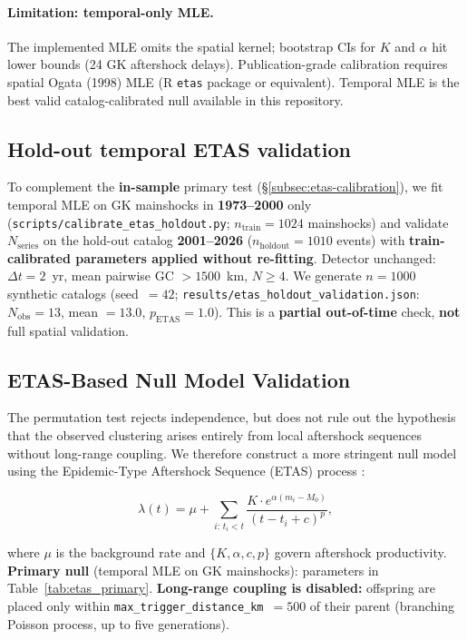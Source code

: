 \documentclass[draft]{agujournal2019}
\begin{document}
\paragraph{Limitation: temporal-only MLE.}
The implemented MLE omits the spatial kernel; bootstrap CIs for $K$ and
$\alpha$ hit lower bounds (24 GK aftershock delays). Publication-grade
calibration requires spatial Ogata (1998) MLE (R \texttt{etas} package or
equivalent). Temporal MLE is the best valid catalog-calibrated null
available in this repository.

\subsection{Hold-out temporal ETAS validation}
\label{subsec:holdout-methods}

To complement the \textbf{in-sample} primary test (\S\ref{subsec:etas-calibration}),
we fit temporal MLE on GK mainshocks in \textbf{1973--2000} only
(\texttt{scripts/calibrate\_etas\_holdout.py}; $n_\mathrm{train}=1024$ mainshocks)
and validate $N_\mathrm{series}$ on the hold-out catalog \textbf{2001--2026}
($n_\mathrm{holdout}=1010$ events) with \textbf{train-calibrated parameters
applied without re-fitting}.
Detector unchanged: $\Delta t = 2$~yr, mean pairwise GC $> 1500$~km, $N \ge 4$.
We generate $n = 1000$ synthetic catalogs (seed~$= 42$;
\texttt{results/etas\_holdout\_validation.json}: $N_\mathrm{obs}=13$,
mean $= 13.0$, $p_\mathrm{ETAS}=1.0$).
This is a \textbf{partial out-of-time} check, \textbf{not} full spatial validation.

\subsection{ETAS-Based Null Model Validation}
\label{subsec:etas}

The permutation test rejects independence, but does not rule out the
hypothesis that the observed clustering arises entirely from local
aftershock sequences without long-range coupling.
We therefore construct a more stringent null model using the
Epidemic-Type Aftershock Sequence (ETAS) process
\citep{Ogata1988, Ogata1998, HelmstettterSornette2003}:

\begin{equation}
  \lambda(t) = \mu + \sum_{i:\,t_i < t}
  \frac{K \cdot e^{\alpha(m_i - M_0)}}{(t - t_i + c)^{p}},
  \label{eq:etas}
\end{equation}

\noindent where $\mu$ is the background rate and $\{K, \alpha, c, p\}$
govern aftershock productivity.
\textbf{Primary null} (temporal MLE on GK mainshocks): parameters in
Table~\ref{tab:etas_primary}.
\textbf{Long-range coupling is disabled:} offspring are placed only within
\texttt{max\_trigger\_distance\_km}~$= 500$ of their parent (branching
Poisson process, up to five generations).
\end{document}
